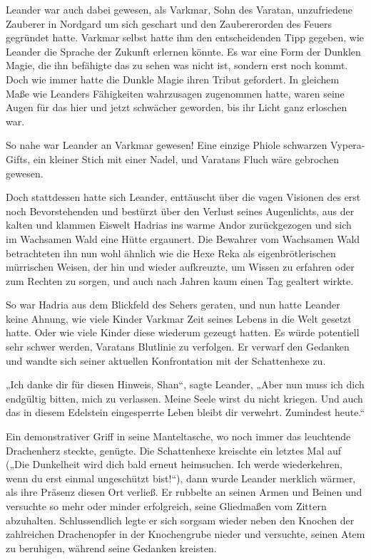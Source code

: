 Leander war auch dabei gewesen, als Varkmar, Sohn des Varatan, unzufriedene Zauberer in Nordgard um sich geschart und den Zaubererorden des Feuers gegründet hatte. Varkmar selbst hatte ihm den entscheidenden Tipp gegeben, wie Leander die Sprache der Zukunft erlernen könnte. Es war eine Form der Dunklen Magie, die ihn befähigte das zu sehen was nicht ist, sondern erst noch kommt. Doch wie immer hatte die Dunkle Magie ihren Tribut gefordert. In gleichem Maße wie Leanders Fähigkeiten wahrzusagen zugenommen hatte, waren seine Augen für das hier und jetzt schwächer geworden, bis ihr Licht ganz erloschen war.

So nahe war Leander an Varkmar gewesen! Eine einzige Phiole schwarzen Vypera-Gifts, ein kleiner Stich mit einer Nadel, und Varatans Fluch wäre gebrochen gewesen.

Doch stattdessen hatte sich Leander, enttäuscht über die vagen Visionen des erst noch Bevorstehenden und bestürzt über den Verlust seines Augenlichts, aus der kalten und klammen Eiswelt Hadrias ins warme Andor zurückgezogen und sich im Wachsamen Wald eine Hütte ergaunert. Die Bewahrer vom Wachsamen Wald betrachteten ihn nun wohl ähnlich wie die Hexe Reka als eigenbrötlerischen mürrischen Weisen, der hin und wieder aufkreuzte, um Wissen zu erfahren oder zum Rechten zu sorgen, und auch nach Jahren kaum einen Tag gealtert wirkte.

So war Hadria aus dem Blickfeld des Sehers geraten, und nun hatte Leander keine Ahnung, wie viele Kinder Varkmar Zeit seines Lebens in die Welt gesetzt hatte. Oder wie viele Kinder diese wiederum gezeugt hatten. Es würde potentiell sehr schwer werden, Varatans Blutlinie zu verfolgen. Er verwarf den Gedanken und wandte sich seiner aktuellen Konfrontation mit der Schattenhexe zu.

„Ich danke dir für diesen Hinweis, Shan“, sagte Leander, „Aber nun muss ich dich endgültig bitten, mich zu verlassen. Meine Seele wirst du nicht kriegen. Und auch das in diesem Edelstein eingesperrte Leben bleibt dir verwehrt. Zumindest heute.“

Ein demonstrativer Griff in seine Manteltasche, wo noch immer das leuchtende Drachenherz steckte, genügte. Die Schattenhexe kreischte ein letztes Mal auf („Die Dunkelheit wird dich bald erneut heimsuchen. Ich werde wiederkehren, wenn du erst einmal ungeschützt bist!“), dann wurde Leander merklich wärmer, als ihre Präsenz diesen Ort verließ. Er rubbelte an seinen Armen und Beinen und versuchte so mehr oder minder erfolgreich, seine Gliedmaßen vom Zittern abzuhalten. Schlussendlich legte er sich sorgsam wieder neben den Knochen der zahlreichen Drachenopfer in der Knochengrube nieder und versuchte, seinen Atem zu beruhigen, während seine Gedanken kreisten.



